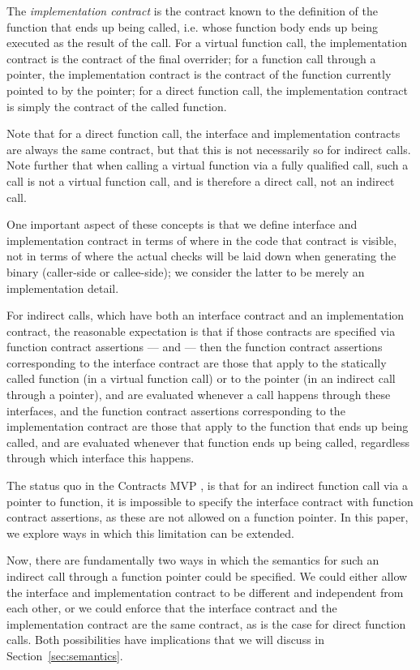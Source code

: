 The \emph{implementation contract} is the contract known to the definition of the function that ends up being called, i.e. whose function body ends up being executed as the result of the call. For a virtual function call, the implementation contract is the contract of the final overrider; for a function call through a pointer, the implementation contract is the contract of the function currently pointed to by the pointer; for a direct function call, the implementation contract is simply the contract of the called function.

Note that for a direct function call, the interface and implementation contracts are always the same contract, but that this is not necessarily so for indirect calls. Note further that when calling a virtual function via a fully qualified call, such a call is not a virtual function call, and is therefore a direct call, not an indirect call.

One important aspect of these concepts is that we define interface and implementation contract in terms of where in the code that contract is visible, not in terms of where the actual checks will be laid down when generating the binary (caller-side or callee-side); we consider the latter to be merely an implementation detail.

\pagebreak  %

For indirect calls, which have both an interface contract and an implementation contract, the reasonable expectation is that if those contracts are specified via function contract assertions ---  and  --- then the function contract assertions corresponding to the interface contract are those that apply to the statically called function (in a virtual function call) or to the pointer (in an indirect call through a pointer), and are evaluated whenever a call happens through these interfaces, and the function contract assertions corresponding to the implementation contract are those that apply to the function that ends up being called, and are evaluated whenever that function ends up being called, regardless through which interface this happens.

The status quo in the Contracts MVP \cite{P2900R7}, is that for an indirect function call via a pointer to function, it is impossible to specify the interface contract with function contract assertions, as these are not allowed on a function pointer. In this paper, we explore ways in which this limitation can be extended.

Now, there are fundamentally two ways in which the semantics for such an indirect call through a function pointer could be specified. We could either allow the interface and implementation contract to be different and independent from each other, or we could enforce that the interface contract and the implementation contract are the same contract, as is the case for direct function calls. Both possibilities have implications that we will discuss in Section~\ref{sec:semantics}.

